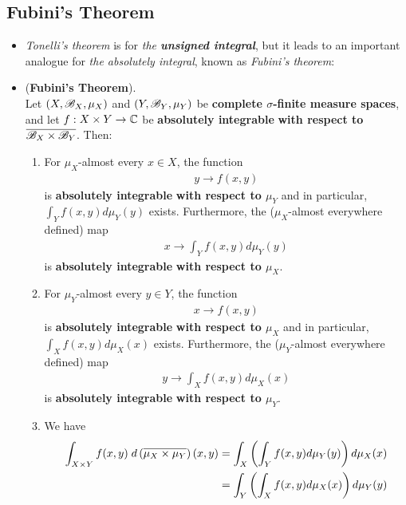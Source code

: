 \documentclass[11pt]{article}
\begin{document}
\subsection{Fubini's Theorem}
\begin{itemize}
\item \begin{remark}
\emph{Tonelli's theorem} is for \emph{the \textbf{unsigned integral}}, but it leads to an important analogue for \emph{the absolutely integral}, known as \emph{Fubini's theorem}:
\end{remark}

\item \begin{theorem} (\textbf{Fubini’s Theorem}). \citep{tao2011introduction}\\
Let $(X, {\mathscr B}_X, \mu_X)$ and $(Y, {\mathscr B}_Y, \mu_Y)$ be \textbf{complete $\sigma$-finite measure spaces}, and let $f: X \times Y \to {\mathbb C}$ be \textbf{absolutely integrable} \textbf{with respect to} $\overline{{\mathscr B}_X \times {\mathscr B}_Y}$. Then:
\begin{enumerate}
\item For $\mu_X$-almost every  $x \in X$,  the function
\begin{align*}
y \to f(x,y)
\end{align*} is \textbf{absolutely integrable} \textbf{with respect to $\mu_Y$} and in particular, $\int_Y f(x,y) d\mu_Y(y)$ exists. Furthermore, the ($\mu_X$-almost everywhere defined) map
\begin{align*}
x \to \int_Y f(x,y) d\mu_Y(y)
\end{align*} is \textbf{absolutely integrable} \textbf{with respect to $\mu_X$}.

\item  For $\mu_Y$-almost every  $y \in Y$,  the function
\begin{align*}
x \to f(x,y)
\end{align*} is \textbf{absolutely integrable} \textbf{with respect to $\mu_X$} and in particular, $\int_X f(x,y) d\mu_X(x)$ exists. Furthermore, the ($\mu_Y$-almost everywhere defined) map
\begin{align*}
y \to \int_X f(x,y) d\mu_X(x)
\end{align*} is \textbf{absolutely integrable} \textbf{with respect to $\mu_Y$}.

\item We have
\begin{align}
\int_{X \times Y} f(x, y) \;d\left(\overline{\mu_X \times \mu_Y}\right)(x, y) &= \int_X\left(\int_Y f(x, y) d\mu_Y(y)\right) d\mu_X(x) \nonumber\\
&=  \int_Y\left(\int_Xf(x, y) d\mu_X(x) \right)d\mu_Y(y)  \label{eqn: fubini_theorem_1}
\end{align}
\end{enumerate}
\end{theorem}


\end{itemize}
\end{document}
